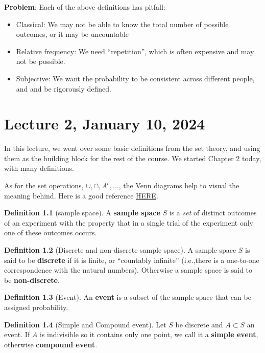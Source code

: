 \documentclass[
]{book}
\providecommand{\tightlist}{%
  \setlength{\itemsep}{0pt}\setlength{\parskip}{0pt}}
\theoremstyle{definition}
\newtheorem{definition}{Definition}[chapter]
\theoremstyle{definition}
\theoremstyle{definition}
\theoremstyle{definition}
\theoremstyle{remark}
\begin{document}
\textbf{Problem}: Each of the above definitions has pitfall:

\begin{itemize}
\tightlist
\item
  Classical: We may not be able to know the total number of possible outcomes, or it may be uncountable
\item
  Relative frequency: We need ``repetition'', which is often expensive and may not be possible.
\item
  Subjective: We want the probability to be consistent across different people, and and be rigorously defined.
\end{itemize}

\chapter{Lecture 2, January 10, 2024}\label{lecture-2-january-10-2024}

In this lecture, we went over some basic definitions from the set theory, and using them as the building block for the rest of the course. We started Chapter 2 today, with many definitions.

As for the set operations, \(\cup,\cap,A^c,...\), the Venn diagrams help to visual the meaning behind. Here is a good reference \href{https://www.edrawmax.com/article/venn-diagram-symbols-and-set-notations.html}{HERE}.

\begin{definition}[sample space]
A \textbf{sample space} \(S\) is a \emph{set} of distinct outcomes of an experiment with the property that in a single trial of the experiment only one of these outcomes occurs.
\end{definition}

\begin{definition}[Discrete and non-discrete sample space]
A sample space \(S\) is said to be \textbf{discrete} if it is finite, or ``countably infinite'' (i.e.,there is a one-to-one correspondence with the natural numbers). Otherwise a sample space is said to be \textbf{non-discrete}.
\end{definition}

\begin{definition}[Event]
An \textbf{event} is a subset of the sample space that can be assigned probability.
\end{definition}

\begin{definition}[Simple and Compound event]
Let \(S\) be discrete and \(A\subset S\) an event. If \(A\) is indivisible so it contains only one point, we call it a \textbf{simple event}, otherwise \textbf{compound event}.
\end{definition}
\end{document}

